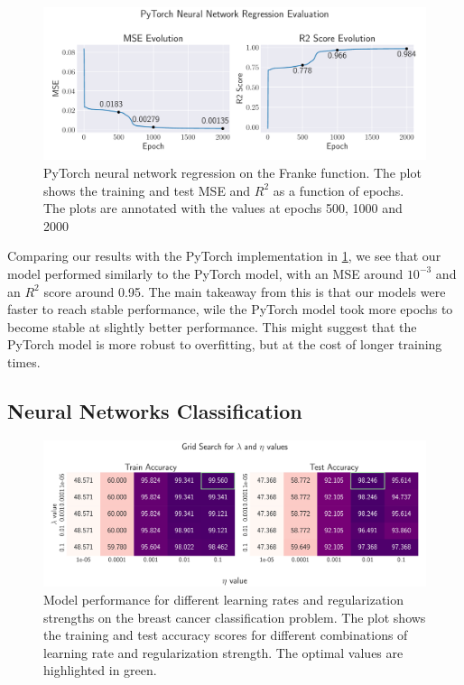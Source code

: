 \onecolumngrid
\begin{figure}[ht!]
    \centering
    \includegraphics[width = .9\textwidth]{../figs/nn_torch_franke.pdf}
    \caption{PyTorch neural network regression on the Franke function. The plot shows the training and test MSE and \( R^2 \) as a function of epochs. The plots are annotated with the values at epochs 500, 1000 and 2000}
    \label{fig:NN_Torch_scores}
\end{figure}
\twocolumngrid

Comparing our results with the PyTorch implementation in \cref{fig:NN_Torch_scores}, we see that our model performed similarly to the PyTorch model, with an MSE around \( 10^{-3} \) and an \( R^2 \) score around 0.95. The main takeaway from this is that our models were faster to reach stable performance, wile the PyTorch model took more epochs to become stable at slightly better performance. This might suggest that the PyTorch model is more robust to overfitting, but at the cost of longer training times.

\clearpage

\subsection{Neural Networks Classification}

\onecolumngrid
\begin{figure}[ht!]
    \centering
    \includegraphics[width = .9\textwidth]{../figs/classification_lambda_eta.pdf}
    \caption{Model performance for different learning rates and regularization strengths on the breast cancer classification problem. The plot shows the training and test accuracy scores for different combinations of learning rate and regularization strength. The optimal values are highlighted in green.}
    \label{fig:NN_Classification_lambda_eta}
\end{figure}
\twocolumngrid

